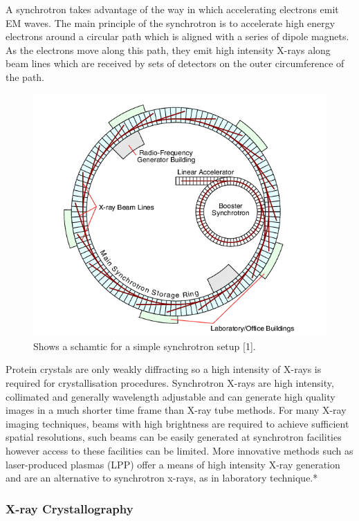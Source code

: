 \documentclass[11pt]{report}
\begin{document}
A synchrotron takes advantage of the way in which accelerating electrons emit EM waves. The main principle of the synchrotron is to accelerate high energy electrons around a circular path which is aligned with a series of dipole magnets. As the electrons move along this path, they emit high intensity X-rays along beam lines which are received by sets of detectors on the outer circumference of the path.

\begin{figure}[h!]
\centering
\includegraphics[scale=0.6]{Synchrotron.jpg}
\caption{Shows a schamtic for a simple synchrotron setup \cite{synchrotrondiag}[1].}
\label{2}
\end{figure}

Protein crystals are only weakly diffracting so a high intensity of X-rays is required for crystallisation procedures. Synchrotron X-rays are high intensity, collimated and generally wavelength adjustable and can generate high quality images in a much shorter time frame than X-ray tube methods. For many X-ray imaging techniques, beams with high brightness are required to achieve sufficient spatial resolutions, such beams can be easily generated at synchrotron facilities however access to these facilities can be limited. More innovative methods such as laser-produced plasmas (LPP) offer a means of high intensity X-ray generation and are an alternative to synchrotron x-rays, as in laboratory technique.*

\subsubsection{X-ray Crystallography}
\end{document}
